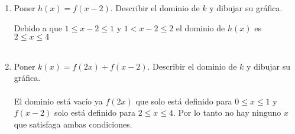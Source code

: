 \begin{enumerate}[ \bfseries 1.]
\begin{enumerate}[\bfseries (a)]
                \item Poner $h(x) = f(x-2).$ Describir el dominio de $k$ \; y dibujar su gráfica.
                    \begin{center}
                    \end{center}
                Debido a que $1\leq x-2 \leq 1$ \; y \; $1 < x-2 \leq 2$ el dominio de $h(x)$ es $2\leq x \leq 4$\\\\ 

                \item Poner $k(x) = f(2x) + f(x-2).$ Describir el dominio de $k$ \; y dibujar su gráfica.\\\\
                El dominio está vacío ya $f(2x)$ que solo está definido para $0 \leq x \leq 1$ \; y \;  $f(x-2)$ solo está definido para $2 \leq x \leq 4$. Por lo tanto no hay ninguno $x$ que satisfaga ambas condiciones. \\\\
            \end{enumerate}
        

\end{enumerate}
